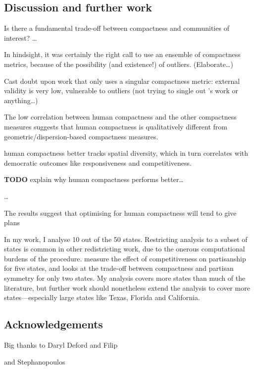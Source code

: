\documentclass[]{article}
\begin{document}
\hypertarget{discussion-and-further-work}{%
\subsection{Discussion and further
work}\label{discussion-and-further-work}}

Is there a fundamental trade-off between compactness and communities of
interest? \ldots{}

In hindsight, it was certainly the right call to use an ensemble of
compactness metrics, because of the possibility (and existence!) of
outliers. (Elaborate\ldots{})

Cast doubt upon work that only uses a singular compactness metric:
external validity is very low, vulnerable to outliers (not trying to
single out \citeauthor{s2020}'s work or anything\ldots{})

The low correlation between human compactness and the other compactness
measures suggests that human compactness is qualitatively different from
geometric/dispersion-based compactness measures.

human compactness better tracks spatial diversity, which in turn
correlates with democratic outcomes like responsiveness and
competitiveness.

\textbf{TODO} explain why human compactness performs better\ldots{}

\ldots{}

The results suggest that optimising for human compactness will tend to
give plans

In my work, I analyse 10 out of the 50 states. Restricting analysis to a
subset of states is common in other redistricting work, due to the
onerous computational burdens of the procedure. \cite{ddj2019comp}
measure the effect of competitiveness on partisanship for five states,
and \cite{s2020} looks at the trade-off between compactness and partisan
symmetry for only two states. My analysis covers more states than much
of the literature, but further work should nonetheless extend the
analysis to cover more states---especially large states like Texas,
Florida and California.

\hypertarget{acknowledgements}{%
\subsection{Acknowledgements}\label{acknowledgements}}

Big thanks to Daryl Deford and Filip

and Stephanopoulos
\end{document}
